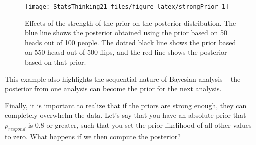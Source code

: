 \documentclass[]{book}
\newenvironment{Shaded}{\begin{snugshade}}{\end{snugshade}}
\newcommand{\KeywordTok}[1]{\textcolor[rgb]{0.13,0.29,0.53}{\textbf{#1}}}
\newcommand{\DataTypeTok}[1]{\textcolor[rgb]{0.13,0.29,0.53}{#1}}
\newcommand{\DecValTok}[1]{\textcolor[rgb]{0.00,0.00,0.81}{#1}}
\newcommand{\FloatTok}[1]{\textcolor[rgb]{0.00,0.00,0.81}{#1}}
\newcommand{\StringTok}[1]{\textcolor[rgb]{0.31,0.60,0.02}{#1}}
\newcommand{\CommentTok}[1]{\textcolor[rgb]{0.56,0.35,0.01}{\textit{#1}}}
\newcommand{\OperatorTok}[1]{\textcolor[rgb]{0.81,0.36,0.00}{\textbf{#1}}}
\newcommand{\NormalTok}[1]{#1}
\theoremstyle{definition}
\theoremstyle{definition}
\theoremstyle{definition}
\theoremstyle{remark}
\begin{document}
\begin{figure}
\texttt{[image: StatsThinking21\_files/figure-latex/strongPrior-1]} \caption{Effects of the strength of the prior on the posterior distribution. The blue line shows the posterior obtained using the prior based on 50 heads out of 100 people.  The dotted black line shows the prior based on 550 heasd out of 500 flips, and the red line shows the posterior based on that prior.}\label{fig:strongPrior}
\end{figure}

This example also highlights the sequential nature of Bayesian analysis
-- the posterior from one analysis can become the prior for the next
analysis.

Finally, it is important to realize that if the priors are strong
enough, they can completely overwhelm the data. Let's say that you have
an absolute prior that \(p_{respond}\) is 0.8 or greater, such that you
set the prior likelihood of all other values to zero. What happens if we
then compute the posterior?

\begin{Shaded}
\end{Shaded}
\end{document}
